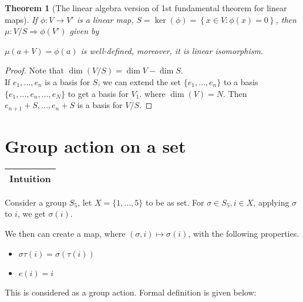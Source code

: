 \documentclass{article}
\theoremstyle{MyNonumberplain}
\theoremstyle{break}
\newtheorem*{proof}{Proof. }
\newcommand{\p}{\phi}
\theoremstyle{break}
\newtheorem{theorem}{Theorem}[section]
\theoremstyle{break}
\theoremstyle{definition}
\theoremstyle{break}
\begin{document}
\begin{thmbox}
    \begin{theorem}[The linear algebra version of 1st fundamental theorem for linear maps]
        If $\p : V \rightarrow V'$ is a linear map, $S = \ker \left( \p \right) =
        \left\{ x \in V : \p (x) = 0 \right\}$, then $\mu : V / S \Rightarrow \p (V')$
        given by

        $\mu (a + V) = \p (a)$ is well-defined, moreover, it is linear isomorphism.
    \end{theorem}
    \begin{prfbox}
        \begin{proof}
            Note that $\dim (V / S) = \dim V - \dim S$.\\

            If $e_1, \ldots, e_n$ is a basis for $S$, we can extend the set $\{ e_1,
            \ldots, e_n \}$ to a basis $\{ e_1, \ldots, e_n, \ldots, e_N \}$ to get a
            basis for $V_1$. where $\dim (V) = N$. Then $e_{n + 1} + S, \ldots, e_n + S$
            is a basis for $V / S$.
        \end{proof}
    \end{prfbox}
\end{thmbox}

\newpage

\setcounter{section}{15}

\section{Group action on a set}

    \begin{tabular}{|c|}
        \hline
        Intuition\\
        \hline
    \end{tabular}
    
    Consider a group $S_5$, let $X = \{ 1, \ldots, 5 \}$ to be as set. For $\sigma
    \in S_5, i \in X$, applying $\sigma$ to $i$, we get $\sigma (i)$.
    
    We then can create a map, where $(\sigma, i) \mapsto \sigma (i)$, with the
    following properties.
    \begin{itemize}
        \item $\sigma \tau (i) = \sigma (\tau (i))$
        
        \item $e (i) = i$
    \end{itemize}
    This is considered as a group action. Formal definition is given below:
\end{document}
